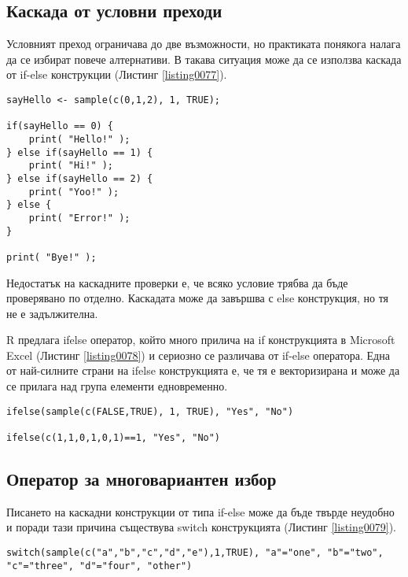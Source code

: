 \subsection{Каскада от условни преходи}

Условният преход ограничава до две възможности, но практиката понякога налага да се избират повече алтернативи. В такава ситуация може да се използва каскада от if-else конструкции (Листинг \ref{listing0077}).

\begin{lstlisting}[caption=Каскада от if-else, label=listing0077]
sayHello <- sample(c(0,1,2), 1, TRUE);

if(sayHello == 0) {
	print( "Hello!" );
} else if(sayHello == 1) {
	print( "Hi!" );
} else if(sayHello == 2) {
	print( "Yoo!" );
} else {
	print( "Error!" );
}

print( "Bye!" );
\end{lstlisting}

Недостатък на каскадните проверки е, че всяко условие трябва да бъде проверявано по отделно. Каскадата може да завършва с else конструкция, но тя не е задължителна. 

R предлага ifelse оператор, който много прилича на if конструкцията в Microsoft Excel (Листинг \ref{listing0078}) и сериозно се различава от if-else оператора. Една от най-силните страни на ifelse конструкцията е, че тя е векторизирана и може да се прилага над група елементи едновременно. 

\begin{lstlisting}[caption=Функцията ifelse, label=listing0078]
ifelse(sample(c(FALSE,TRUE), 1, TRUE), "Yes", "No")

ifelse(c(1,1,0,1,0,1)==1, "Yes", "No")
\end{lstlisting}

\subsection{Оператор за многовариантен избор}

Писането на каскадни конструкции от типа if-else може да бъде твърде неудобно и поради тази причина съществува switch конструкцията (Листинг \ref{listing0079}).

\begin{lstlisting}[caption=Конструкция за многовариантен избор switch, label=listing0079]
switch(sample(c("a","b","c","d","e"),1,TRUE), "a"="one", "b"="two", "c"="three", "d"="four", "other")
\end{lstlisting}


